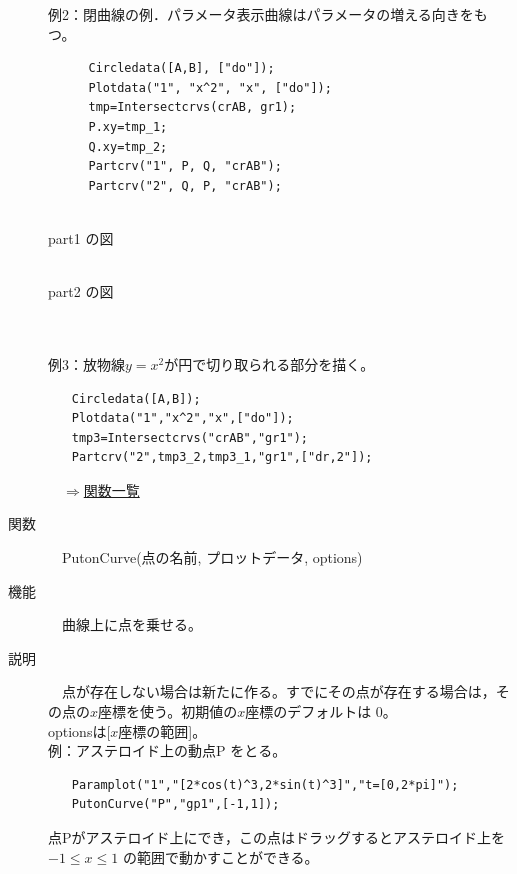 \documentclass[papersize,a4paper,12pt,uplatex]{jsarticle}
\begin{document}
\begin{description}
例2：閉曲線の例．パラメータ表示曲線はパラメータの増える向きをもつ。
\begin{verbatim}
　    Circledata([A,B], ["do"]);
   　 Plotdata("1", "x^2", "x", ["do"]);
    　tmp=Intersectcrvs(crAB, gr1);
    　P.xy=tmp_1;
    　Q.xy=tmp_2;
    　Partcrv("1", P, Q, "crAB");
    　Partcrv("2", Q, P, "crAB");
\end{verbatim}
\vspace{5mm}

\begin{minipage}{45mm}
\begin{center}
\\
part1 の図
\end{center}
\end{minipage}
\hspace{10mm}
\begin{minipage}{45mm}
\begin{center}
\\
part2 の図
\end{center}
\end{minipage}
\\
\\

例3：放物線$y=x^2$が円で切り取られる部分を描く。
\begin{verbatim}
　　Circledata([A,B]);
　　Plotdata("1","x^2","x",["do"]);
　　tmp3=Intersectcrvs("crAB","gr1");
　　Partcrv("2",tmp3_2,tmp3_1,"gr1",["dr,2"]);
\end{verbatim}


\begin{flushright}　\hyperlink{functionlist}{$\Rightarrow$関数一覧}\end{flushright}


\hypertarget{putoncurve}{}
\item[関数]　PutonCurve(点の名前, プロットデータ, options)
\item[機能]　曲線上に点を乗せる。
\item[説明]　点が存在しない場合は新たに作る。すでにその点が存在する場合は，その点の$x$座標を使う。初期値の$x$座標のデフォルトは 0。\\
optionsは[$x$座標の範囲]。\\

例：アステロイド上の動点P をとる。
\begin{verbatim}
　　Paramplot("1","[2*cos(t)^3,2*sin(t)^3]","t=[0,2*pi]");
　　PutonCurve("P","gp1",[-1,1]); 
\end{verbatim}
点Pがアステロイド上にでき，この点はドラッグするとアステロイド上を $-1 \leq x\leq 1$ の範囲で動かすことができる。\\


\end{description}
\end{document}

